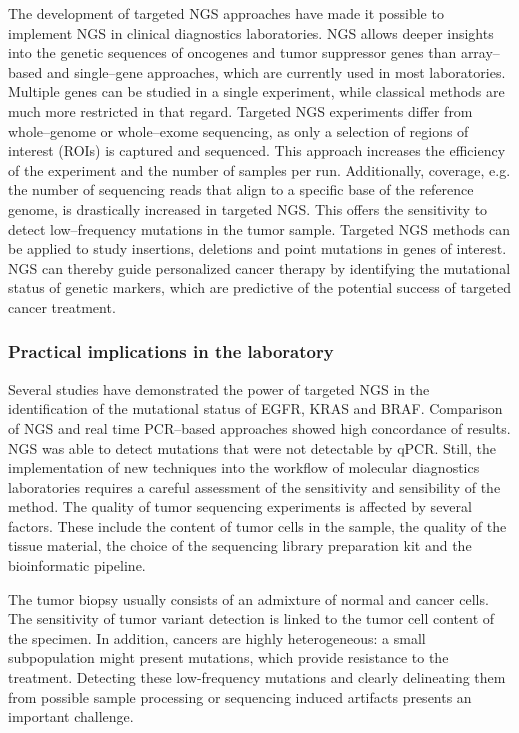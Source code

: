 {{    The development of targeted NGS approaches have made it possible to
    implement NGS in clinical diagnostics laboratories. NGS allows deeper
    insights into the genetic sequences of oncogenes and tumor suppressor
    genes than array--based and single--gene approaches, which are currently
    used in most laboratories. Multiple genes can be studied in a single
    experiment, while classical methods are much more restricted in that
    regard. Targeted NGS experiments differ from whole--genome or whole--exome
    sequencing, as only a selection of regions of interest (ROIs) is captured
    and sequenced. This approach increases the efficiency of the experiment
    and the number of samples per run. Additionally, coverage, e.g. the number
    of sequencing reads that align to a specific base of the reference genome,
    is drastically increased in targeted NGS. This offers the sensitivity to
    detect low--frequency mutations in the tumor sample. Targeted NGS methods
    can be applied to study insertions, deletions and point mutations in genes
    of interest. NGS can thereby guide personalized cancer therapy by
    identifying the mutational status of genetic markers, which are predictive
    of the potential success of targeted cancer treatment.

    \subsubsection{Practical implications in the laboratory}

      Several studies have demonstrated the power of targeted NGS in the
      identification of the mutational status of EGFR, KRAS and BRAF. Comparison
      of NGS and real time PCR--based approaches showed high concordance of
      results. NGS was able to detect mutations that were not detectable by
      qPCR. Still, the implementation of new techniques into the workflow of molecular
      diagnostics laboratories requires a careful assessment of the sensitivity
      and sensibility of the method. The quality of tumor sequencing
      experiments is affected by several factors. These include the content of
      tumor cells in the sample, the quality of the tissue material, the choice
      of the sequencing library preparation kit and the bioinformatic pipeline.

      The tumor biopsy usually consists of an admixture of normal and cancer
      cells. The sensitivity of tumor variant detection is linked to the tumor
      cell content of the specimen. In addition, cancers are highly
      heterogeneous: a small subpopulation might present mutations, which
      provide resistance to the treatment. Detecting these low-frequency
      mutations and clearly delineating them from possible sample processing or
      sequencing induced artifacts presents an important challenge.

}}
